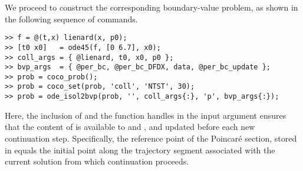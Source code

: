 We proceed to construct the corresponding boundary-value problem, as shown in the following sequence of commands.
\begin{lstlisting}[language=coco-highlight]
>> f = @(t,x) lienard(x, p0);
>> [t0 x0]   = ode45(f, [0 6.7], x0);
>> coll_args = { @lienard, t0, x0, p0 };
>> bvp_args  = { @per_bc, @per_bc_DFDX, data, @per_bc_update };
>> prob = coco_prob();
>> prob = coco_set(prob, 'coll', 'NTST', 30);
>> prob = ode_isol2bvp(prob, '', coll_args{:}, 'p', bvp_args{:});
\end{lstlisting}
Here, the inclusion of  and the  function handles in the  input argument ensures that the content of  is available to  and , and updated before each new continuation step. Specifically, the reference point of the Poincar\'{e} section, stored in  equals the initial point along the trajectory segment associated with the current solution from which continuation proceeds.

